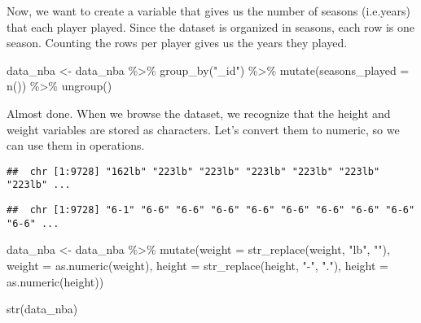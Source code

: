 \documentclass[
]{book}
\newenvironment{Shaded}{\begin{snugshade}}{\end{snugshade}}
\newcommand{\AttributeTok}[1]{\textcolor[rgb]{0.77,0.63,0.00}{#1}}
\newcommand{\FunctionTok}[1]{\textcolor[rgb]{0.00,0.00,0.00}{#1}}
\newcommand{\NormalTok}[1]{#1}
\newcommand{\OtherTok}[1]{\textcolor[rgb]{0.56,0.35,0.01}{#1}}
\newcommand{\SpecialCharTok}[1]{\textcolor[rgb]{0.00,0.00,0.00}{#1}}
\newcommand{\StringTok}[1]{\textcolor[rgb]{0.31,0.60,0.02}{#1}}
\begin{document}
Now, we want to create a variable that gives us the number of seasons (i.e.years)
that each player played. Since the dataset is organized in seasons, each row
is one season. Counting the rows per player gives us the years they played.

\begin{Shaded}
\begin{Highlighting}[]
\NormalTok{data\_nba }\OtherTok{\textless{}{-}}\NormalTok{ data\_nba }\SpecialCharTok{\%\textgreater{}\%}
  \FunctionTok{group\_by}\NormalTok{(}\StringTok{"\_id"}\NormalTok{) }\SpecialCharTok{\%\textgreater{}\%}
  \FunctionTok{mutate}\NormalTok{(}\AttributeTok{seasons\_played =} \FunctionTok{n}\NormalTok{()) }\SpecialCharTok{\%\textgreater{}\%}
  \FunctionTok{ungroup}\NormalTok{()}
\end{Highlighting}
\end{Shaded}

Almost done. When we browse the dataset, we recognize that the height and weight variables are stored as characters. Let's convert them to numeric, so we can
use them in operations.

\begin{Shaded}
\end{Shaded}

\begin{verbatim}
##  chr [1:9728] "162lb" "223lb" "223lb" "223lb" "223lb" "223lb" "223lb" ...
\end{verbatim}

\begin{Shaded}
\end{Shaded}

\begin{verbatim}
##  chr [1:9728] "6-1" "6-6" "6-6" "6-6" "6-6" "6-6" "6-6" "6-6" "6-6" "6-6" ...
\end{verbatim}

\begin{Shaded}
\begin{Highlighting}[]
\NormalTok{data\_nba }\OtherTok{\textless{}{-}}\NormalTok{ data\_nba }\SpecialCharTok{\%\textgreater{}\%}
  \FunctionTok{mutate}\NormalTok{(}\AttributeTok{weight =} \FunctionTok{str\_replace}\NormalTok{(weight, }\StringTok{"lb"}\NormalTok{, }\StringTok{""}\NormalTok{),}
         \AttributeTok{weight =} \FunctionTok{as.numeric}\NormalTok{(weight),}
         \AttributeTok{height =} \FunctionTok{str\_replace}\NormalTok{(height, }\StringTok{"{-}"}\NormalTok{, }\StringTok{"."}\NormalTok{),}
         \AttributeTok{height =} \FunctionTok{as.numeric}\NormalTok{(height))}

\FunctionTok{str}\NormalTok{(data\_nba)}
\end{Highlighting}
\end{Shaded}
\end{document}

